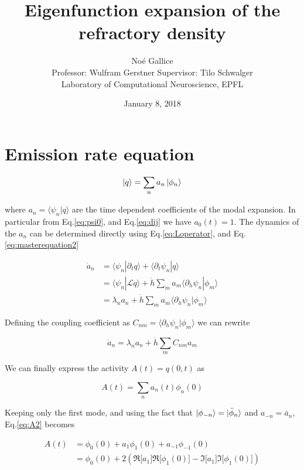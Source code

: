 \documentclass[a4paper,12pt,twoside]{article}
\title{Eigenfunction expansion of the refractory density}
\author{No\'e Gallice \\ Professor: Wulfram Gerstner \hspace{0.5cm}  Supervisor: Tilo Schwalger\\ \small{ Laboratory of Computational Neuroscience, EPFL }
}
\date{January 8, 2018}
\begin{document}
\section{Emission rate equation}


\begin{equation}
\label{eq:q}
\ket{q}=\sum_na_n\ket{\phi_n}
\end{equation}

where $a_n=\langle \psi_n | q\rangle$ are the time dependent coefficients of the modal expansion. In particular from Eq.\eqref{eq:psi0}, and Eq.\eqref{eq:dij} we have $a_0(t)=1$. The dynamics of the $a_n$ can be determined directly using Eq.\eqref{eq:Loperator}, and Eq.\eqref{eq:masterequation2}

\begin{align}
\dot{a}_n&=\langle\psi_n|\partial_t q\rangle+\langle\partial_t\psi_n|q\rangle \nonumber \\
&=\langle\psi_n|\mathcal{L}q\rangle+  \dot{h}\sum_ma_m\langle\partial_h\psi_n|\phi_m \rangle \nonumber \\
&=\lambda_n a_n +  \dot{h}\sum_ma_m\langle\partial_h\psi_n|\phi_m \rangle 
\end{align}

Defining the coupling coefficient as $C_{nm}=\langle\partial_h\psi_n|\phi_m \rangle $ we can rewrite

\begin{equation}
\dot{a}_n=\lambda_n a_n +  \dot{h}\sum_mC_{nm}a_m 
\end{equation}



We can finally express the activity $A(t)=q(0,t)$ as

\begin{equation}
\label{eq:A2}
A(t)=\sum_na_n(t)\phi_n(0)
\end{equation}

Keeping only the first mode, and using the fact that $\ket{\phi_{-n}}=\ket{\bar{\phi}_n}$ and $a_{-n}=\bar{a}_n$,  Eq.\eqref{eq:A2} becomes

\begin{align}
\label{eq:A3}
A(t)&=\phi_0(0) + a_1\phi_1(0) +a_{-1}\phi_{-1}(0) \nonumber \\
&=\phi_0(0) + 2\left(\Re\big[a_1\big]\Re\big[\phi_1(0)\big]- \Im\big[a_1\big]\Im\big[\phi_1(0)\big]\right)
\end{align}
\end{document}
